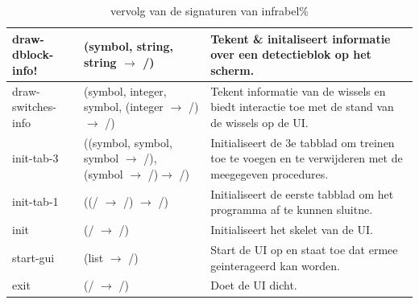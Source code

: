 \documentclass{article}
\begin{document}
\begin{table}[h!]
        \centering
        \begin{tabular}{|p{2.9cm}|p{4cm}|p{6.1cm}|}
                \hline
                draw-dblock-info! & (symbol, string, string $\rightarrow$ /) & Tekent \& initaliseert informatie over een detectieblok op het scherm. \\
                \hline
                draw-switches-info & (symbol, integer, symbol, (integer $\rightarrow$ /) $\rightarrow$ /) & Tekent informatie van de wissels en biedt interactie toe met de stand van de wissels op de UI.\\
                \hline
                init-tab-3 & ((symbol, symbol, symbol $\rightarrow$ /), (symbol $\rightarrow$ /)$\rightarrow$ /) & Initialiseert de 3e tabblad om treinen toe te voegen en te verwijderen met de meegegeven procedures.\\
                \hline
                init-tab-1 & ((/ $\rightarrow$ /) $\rightarrow$ /) & Initialiseert de eerste tabblad om het programma af te kunnen sluitne. \\
                \hline
                init & (/ $\rightarrow$ /) & Initialiseert het skelet van de UI.\\
                \hline
                start-gui & (list $\rightarrow$ /) & Start de UI op en staat toe dat ermee geinterageerd kan worden.\\
                \hline
                exit & (/ $\rightarrow$ /) & Doet de UI dicht.\\
                \hline
        \end{tabular}
        \caption{vervolg van de signaturen van infrabel\%}
\end{table}
\end{document}
